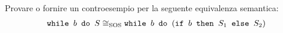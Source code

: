 {Provare o fornire un controesempio per la seguente equivalenza semantica:
\begin{align*}
\wbS{b}{S} \eqSOS \wbS{b}{(\ifABC{b}{S_1}{S_2})}
\end{align*}}
{}
